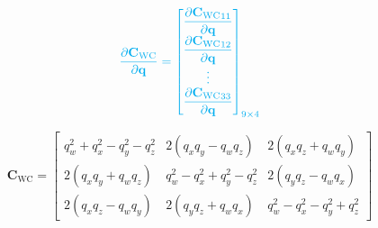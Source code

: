 \documentclass{article}
\renewcommand{\Vec}[1]{{\mathbf{#1}}}
\newcommand{\Mat}[1]{{\mathbf{#1}}}
\newcommand{\quat}{{\Vec{q}}}
\newcommand{\cam}{{\text{C}}}
\newcommand{\world}{{\text{W}}}
\newcommand{\KineNotationTransform}[3]{{{#1}_{#2#3}}}
\newcommand{\rot}{{\Mat{C}}}
\newcommand{\Rot}[2]{{\KineNotationTransform{\rot}{#1}{#2}}}
\newcommand{\camRot}{{\Rot{\world}{\cam}}}
\begin{document}
\begin{align}
  \color{cyan}
  \dfrac{\partial{\camRot}}{\partial{\quat}} =
  \begin{bmatrix}
    \dfrac{\partial{\camRot_{11}}}{\partial{\quat}} \\
    \dfrac{\partial{\camRot_{12}}}{\partial{\quat}} \\
    \vdots \\
    \dfrac{\partial{\camRot_{33}}}{\partial{\quat}}
  \end{bmatrix}_{9 \times 4}
\end{align}

\begin{equation}
  \camRot = \begin{bmatrix}
    q_{w}^{2} + q_{x}^{2} - q_{y}^{2} - q_{z}^{2}
    & 2 (q_{x} q_{y} - q_{w} q_{z})
    & 2 (q_{x} q_{z} + q_{w} q_{y}) \\
    2 (q_{x} q_{y} + q_{w} q_{z})
    & q_{w}^{2} - q_{x}^{2} + q_{y}^{2} - q_{z}^{2}
    & 2 (q_{y} q_{z} - q_{w} q_{x}) \\
    2 (q_{x} q_{z} - q_{w} q_{y})
    & 2 (q_{y} q_{z} + q_{w} q_{x})
    & q_{w}^{2} - q_{x}^{2} - q_{y}^{2} + q_{z}^{2}
  \end{bmatrix}
  \nonumber
\end{equation}
\end{document}
